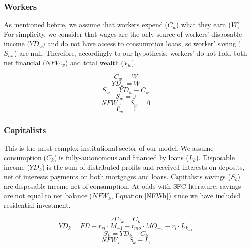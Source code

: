 \documentclass[11pt]{article}
\begin{document}
\subsubsection*{Workers}
\label{sec:org467fa33}
As mentioned before, we assume that workers expend (\(C_w\)) what they earn (\(W\)). 
For simplicity, we consider that wages are the only source of workers' disposable income (\(YD_{w}\)) and do not have access to consumption loans, so worker' saving (\(S_{hw}\)) are null.
Therefore, accordingly to our hypothesis, workers' do not hold both net financial (\(NFW_{w}\)) and total wealth (\(V_{w}\)).

\begin{equation}
C_w = W
\end{equation}
\begin{equation}
YD_w = W
\end{equation}
\begin{equation}
S_{w} = YD_w - C_w
\end{equation}
$$
S_{w} = 0
$$
\begin{equation}
NFW_{w} = S_{w} = 0
\end{equation}
\begin{equation}
V_{w} = 0
\end{equation}

\subsubsection*{Capitalists}
\label{sec:org3eafbb9}
This is the most complex institutional sector of our model. 
We assume consumption (\(C_k\)) is fully-autonomous and financed by loans (\(L_{k}\)). 
Disposable income (\(YD_k\)) is the sum of distributed profits and received interests on deposits, net of interests payments
on both mortgages and loans.
Capitalists savings (\(S_{k}\)) are disposable income net of consumption.
At odds with SFC literature, savings are not equal to net balance (\(NFW_{k}\), Equation \ref{NFWh}) since we have included residential investment.

\begin{equation}
\Delta L_{k} = C_k
\end{equation}
\begin{equation}
    \label{EqYD}
    YD_k = FD + \overline r_m\cdot M_{-1} - r_{mo}\cdot MO_{-1} - r_{l}\cdot L_{k_{-1}}
\end{equation}
\begin{equation}
    \label{EqSh}
    S_{k} = YD_k - C_k
\end{equation}
\begin{equation}
\label{NFWh}
    NFW_{k} = S_{k} - I_h
\end{equation}
\end{document}
